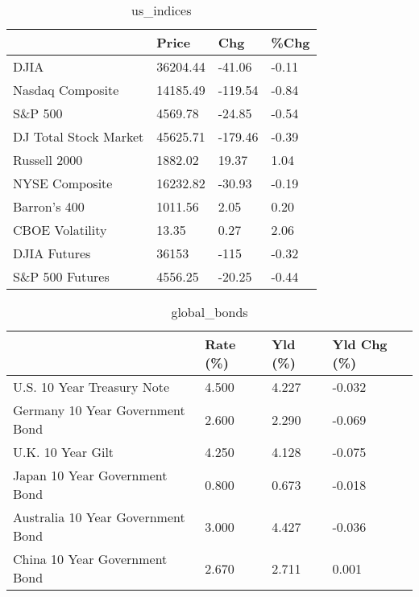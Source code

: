 \documentclass{article}%
\begin{document}
%


\begin{table}[htbp]%
\caption{us\_indices}%
\centering%
\begin{adjustbox}{width=1\textwidth}%
\begin{tabular}{llll}
\toprule
                      &    Price &     Chg &  \%Chg \\
\midrule
                 DJIA & 36204.44 &  -41.06 & -0.11 \\
     Nasdaq Composite & 14185.49 & -119.54 & -0.84 \\
              S\&P 500 &  4569.78 &  -24.85 & -0.54 \\
DJ Total Stock Market & 45625.71 & -179.46 & -0.39 \\
         Russell 2000 &  1882.02 &   19.37 &  1.04 \\
       NYSE Composite & 16232.82 &  -30.93 & -0.19 \\
         Barron's 400 &  1011.56 &    2.05 &  0.20 \\
      CBOE Volatility &    13.35 &    0.27 &  2.06 \\
         DJIA Futures &    36153 &    -115 & -0.32 \\
      S\&P 500 Futures &  4556.25 &  -20.25 & -0.44 \\
\bottomrule
\end{tabular}
%
\end{adjustbox}%
\end{table}

%


\begin{table}[htbp]%
\caption{global\_bonds}%
\centering%
\begin{adjustbox}{width=1\textwidth}%
\begin{tabular}{llll}
\toprule
                                  & Rate (\%) & Yld (\%) & Yld Chg (\%) \\
\midrule
       U.S. 10 Year Treasury Note &    4.500 &   4.227 &      -0.032 \\
  Germany 10 Year Government Bond &    2.600 &   2.290 &      -0.069 \\
                U.K. 10 Year Gilt &    4.250 &   4.128 &      -0.075 \\
    Japan 10 Year Government Bond &    0.800 &   0.673 &      -0.018 \\
Australia 10 Year Government Bond &    3.000 &   4.427 &      -0.036 \\
    China 10 Year Government Bond &    2.670 &   2.711 &       0.001 \\
\bottomrule
\end{tabular}
%
\end{adjustbox}%
\end{table}
\end{document}
